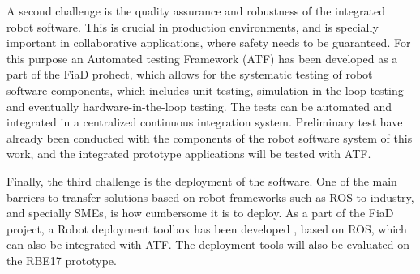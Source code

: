 \documentclass[a4paper,11pt,twoside]{StyleThese}
\begin{document}
A second challenge is the quality assurance and robustness of the integrated robot software. This is crucial in production environments, and is specially important in collaborative applications, where safety needs to be guaranteed. For this purpose an Automated testing Framework (ATF) has been developed \cite{Weisshardt-2016} as a part of the FiaD prohect, which
allows for the systematic testing of robot software components, which includes unit
 testing, simulation-in-the-loop testing and eventually hardware-in-the-loop testing.
The tests can be automated and integrated in a centralized continuous
integration system. Preliminary test have already been conducted with the
components of the robot software system of this work, and the integrated
prototype applications will be tested with ATF.

Finally, the third challenge is the deployment of the software. One of the main barriers to transfer solutions based on robot frameworks such as ROS to industry, and specially SMEs, is how cumbersome it is
to deploy. As a part of the FiaD project, a Robot deployment toolbox has been developed \cite{Ludtke-2017}, based on ROS, which can also be integrated with ATF. The deployment tools will also be evaluated on the RBE17 prototype.
\end{document}
